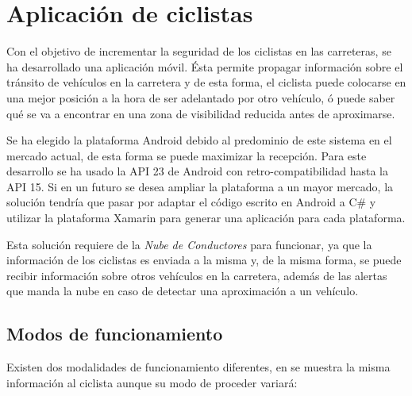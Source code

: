 \section{Aplicación de ciclistas}\label{section:appCiclistas}
Con el objetivo de incrementar la seguridad de los ciclistas en las carreteras, se ha desarrollado una aplicación móvil. Ésta permite propagar información sobre el tránsito de vehículos en la carretera y de esta forma, el ciclista puede colocarse en una mejor posición a la hora de ser adelantado por otro vehículo, ó puede saber qué se va a encontrar en una zona de visibilidad reducida antes de aproximarse.

Se ha elegido la plataforma Android debido al predominio de este sistema en el mercado actual, de esta forma se puede maximizar la recepción. Para este desarrollo se ha usado la API 23 de Android con retro-compatibilidad hasta la API 15. Si en un futuro se desea ampliar la plataforma a un mayor mercado, la solución tendría que pasar por adaptar el código escrito en Android a C\# y utilizar la plataforma Xamarin para generar una aplicación para cada plataforma.

Esta solución requiere de la \emph{Nube de Conductores} para funcionar, ya que la información de los ciclistas es enviada a la misma y, de la misma forma, se puede recibir información sobre otros vehículos en la carretera, además de las alertas que manda la nube en caso de detectar una aproximación a un vehículo.

\subsection{Modos de funcionamiento}\label{ssection:commHUB}
Existen dos modalidades de funcionamiento diferentes, en se muestra la misma información al ciclista aunque su modo de proceder variará:
		

